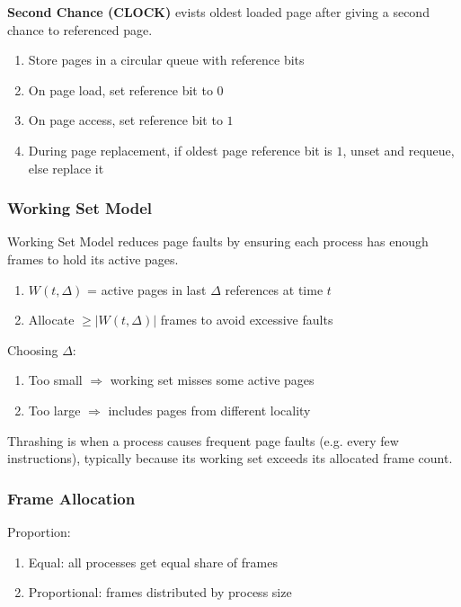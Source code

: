 \documentclass[12pt, a4paper]{article}
\begin{document}
\begin{multicols*}{3}
\textbf{Second Chance (CLOCK)} evists oldest loaded page after giving a second chance to referenced page.
\begin{enumerate}[\roman*.]
  \item Store pages in a circular queue with reference bits
  \item On page load, set reference bit to $0$
  \item On page access, set reference bit to $1$
  \item During page replacement, if oldest page reference bit is $1$, unset and requeue, else replace it 
\end{enumerate}

\colbreak
\subsubsection{Working Set Model}
Working Set Model reduces page faults by ensuring each process has enough frames to hold its active pages.
\begin{enumerate}[label=\roman*., leftmargin=*]
  \item $W(t, \Delta)$ = active pages in last $\Delta$ references at time $t$
  \item Allocate $\geq |W(t, \Delta)|$ frames to avoid excessive faults
\end{enumerate}

Choosing $\Delta$:
\begin{enumerate}[\roman*.]
  \item Too small $\Rightarrow$ working set misses some active pages
  \item Too large $\Rightarrow$ includes pages from different locality
\end{enumerate}

Thrashing is when a process causes frequent page faults (e.g. every few instructions), typically because its working set exceeds its allocated frame count. 

\subsubsection{Frame Allocation}

Proportion:
\begin{enumerate}[\roman*.]
  \item Equal: all processes get equal share of frames
  \item Proportional: frames distributed by process size
\end{enumerate}


\end{multicols*}
\end{document}
